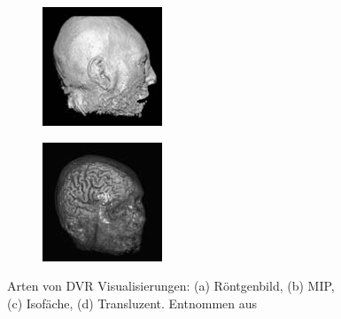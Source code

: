 \documentclass[a4paper,fontsize=12pt,toc=bib,halfparskip,ngerman]{scrartcl}
\begin{document}
\begin{figure}
\begin{subfigure}{0.24\textwidth}
		\subcaption{}
		\label{DVR:MIP}
	\end{subfigure}
	\begin{subfigure}{0.24\textwidth}
		\includegraphics[width=\textwidth]{pictures/Iso.png}
		\subcaption{}
		\label{DVR:Isosurface}
	\end{subfigure}
	\begin{subfigure}{0.24\textwidth}
		\includegraphics[width=\textwidth]{pictures/Trans.png}
		\subcaption{}
		\label{DVR:Translucent}
	\end{subfigure}
	\caption{Arten von DVR Visualisierungen: (a) R\"ontgenbild, (b) MIP,\\ 
		(c) Isof\"ache, (d) Transluzent. Entnommen aus \cite[S.~134]{hansen2005visualization}}
	\label{DVRModes}
\end{figure}
\end{document}
